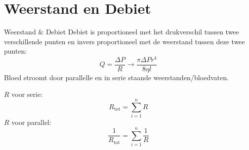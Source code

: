 \documentclass{beamer}
\begin{document}
\section{Weerstand en Debiet}
\begin{frame}{Weerstand \& Debiet}
     Debiet is proportioneel met het drukverschil tussen twee verschillende punten en invers proportioneel met de weerstand tussen deze twee punten:
     \begin{equation*}
         Q = \frac{\Delta P}{R} \rightarrow \frac{\pi\Delta P r^4}{8\eta l}
     \end{equation*}
     Bloed stroomt door parallelle en in serie staande weerstanden/bloedvaten. 

     \alert{$R$ voor serie}:
     \begin{equation*}
         R_{\text{tot}} = \sum_{i=1}^{n} R
     \end{equation*}
     \alert{$R$ voor parallel}:
     \begin{equation*}
         \frac{1}{R_{\text{tot}}} = \sum_{i=1}^{n} \frac{1}{R}
     \end{equation*}
 \end{frame}
{\aauwavesbg
\begin{frame}
\end{frame}}
\end{document}

